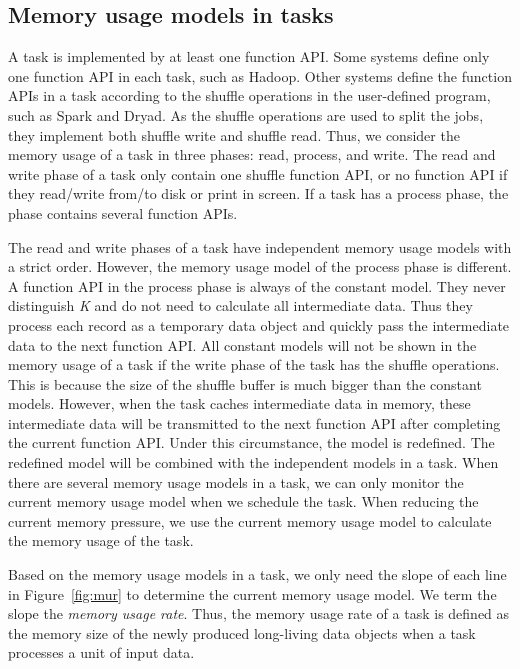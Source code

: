 \subsection{Memory usage models in tasks}
\label{subsec:taskmodel}

A task is implemented by at least one function API. Some systems define only one function API in each task, such as Hadoop. Other systems define the function APIs in a task according to the shuffle operations in the user-defined program, such as Spark and Dryad. As the shuffle operations are used to split the jobs, they implement both shuffle write and shuffle read. Thus, we consider the memory usage of a task in three phases: read, process, and write. The read and write phase of a task only contain one shuffle function API, or no function API if they read/write from/to disk or print in screen. If a task has a process phase, the phase contains several function APIs. 

The read and write phases of a task have independent memory usage models with a strict order. However, the memory usage model of the process phase is different. A function API in the process phase is always of the constant model. They never distinguish  \textit{K} and do not need to calculate all intermediate data. Thus they process each record as a temporary data object and quickly pass the intermediate data to the next function API. All constant models will not be shown in the memory usage of a task if the write phase of the task has the shuffle operations. This is because the size of the shuffle buffer is much bigger than the constant models. However, when the task caches intermediate data in memory, these intermediate data will be transmitted to the next function API after completing the current function API. Under this circumstance, the model is redefined. The redefined model will be combined with the independent models in a task. When there are several memory usage models in a task, we can only monitor the current memory usage model when we schedule the task. When reducing the current memory pressure, we use the current memory usage model to calculate the memory usage of the task.

Based on the memory usage models in a task, we only need the slope of each line in Figure~\ref{fig:mur} to determine the current memory usage model. We term the slope the \textit{memory usage rate}. Thus, the memory usage rate of a task is defined as the memory size of the newly produced long-living data objects when a task processes a unit of input data. 

